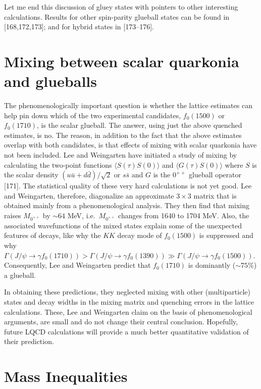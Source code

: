Let me end this discussion of gluey states with pointers to other interesting calculations. Results for other spin-parity glueball states can be found in [168,172,173]; and for hybrid states in [173--176].

\section{Mixing between scalar quarkonia and glueballs}

The phenomenologically important question is whether the lattice estimates can help pin down which of the two experimental candidates, $f_0(1500)$ or $f_0(1710)$, is the scalar glueball. The answer, using just the above quenched estimates, is no. The reason, in addition to the fact that the above estimates overlap with both candidates, is that effects of mixing with scalar quarkonia have not been included. Lee and Weingarten have initiated a study of mixing by calculating the two-point functions $\langle S(\tau) S(0) \rangle$ and $\langle G(\tau) S(0) \rangle$ where $S$ is the scalar density $(u\bar{u} + d\bar{d})/\sqrt{2}$ or $s\bar{s}$ and $G$ is the $0^{++}$ glueball operator [171]. The statistical quality of these very hard calculations is not yet good. Lee and Weingarten, therefore, diagonalize an approximate $3 \times 3$ matrix that is obtained mainly from a phenomenological analysis. They then find that mixing raises $M_{0^{++}}$ by $\sim 64$ MeV, i.e.\ $M_{0^{++}}$ changes from 1640 to 1704 MeV. Also, the associated wavefunctions of the mixed states explain some of the unexpected features of decays, like why the $KK$ decay mode of $f_0(1500)$ is suppressed and why $\Gamma(J/\psi \to \gamma f_0(1710)) > \Gamma(J/\psi \to \gamma f_0(1390)) \gg \Gamma(J/\psi \to \gamma f_0(1500))$. Consequently, Lee and Weingarten predict that $f_0(1710)$ is dominantly ($\sim 75\%$) a glueball.

In obtaining these predictions, they neglected mixing with other (multiparticle) states and decay widths in the mixing matrix and quenching errors in the lattice calculations. These, Lee and Weingarten claim on the basis of phenomenological arguments, are small and do not change their central conclusion. Hopefully, future LQCD calculations will provide a much better quantitative validation of their prediction.

\section{Mass Inequalities}

